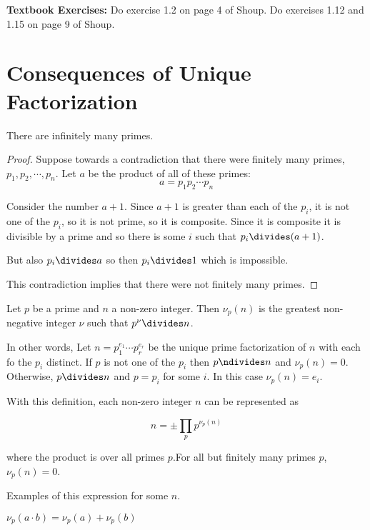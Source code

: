 \documentclass[oneside,12pt]{amsart}
\begin{document}
\textbf{Textbook Exercises:} Do exercise 1.2 on page 4 of Shoup. Do
exercises 1.12 and 1.15 on page 9 of Shoup.

\newpage

\section{Consequences of Unique Factorization}

\begin{theorem}
There are infinitely many primes.
\end{theorem}
\begin{proof}
Suppose towards a contradiction that there were finitely many primes,
$p_1,p_2,\cdots,p_n$. Let $a$ be the product of all of these primes:
$$a=p_1 p_2 \cdots p_n$$

Consider the number $a+1$. Since $a+1$ is greater than each of the $p_i$, it is not
one of the $p_i$, so it is not prime, so it is composite. Since it is composite
it is divisible by a prime and so there is some $i$ such that $p_i \divides (a+1)$.

But also $p_i \divides a$ so then $p_i \divides 1$ which is impossible.

This contradiction implies that there were not finitely many primes.
\end{proof}

\begin{definition}
Let $p$ be a prime and $n$ a non-zero integer. Then $\nu_p(n)$ is the greatest
non-negative integer $\nu$ such that $p^{\nu}\divides n$. 

In other words,
Let $n = p_1^{e_1} \cdots p_r^{e_r}$ be the unique prime factorization of $n$ with each
fo the $p_i$ distinct. If $p$ is not one of the $p_i$ then $p\ndivides n$ and
$\nu_p(n) = 0$. Otherwise, $p\divides n$ and $p=p_i$ for some $i$. In this case
$\nu_p(n) = e_i$.
\end{definition}

With this definition, each non-zero integer $n$ can be represented as

$$n = \pm \prod_p p^{\nu_p(n)}$$

where the product is over all primes $p$.For all but finitely many primes $p$,
$\nu_p(n)=0$.

\begin{in_class_example}
Examples of this expression for some $n$.
\end{in_class_example}

\begin{numbered_fact}
$\nu_p(a\cdot b) = \nu_p(a) + \nu_p(b)$
\end{numbered_fact}
\end{document}
